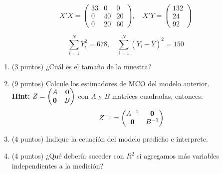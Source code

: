 \documentclass[10pt,a4paper]{article}
\begin{document}
\begin{enumerate}
    \[
    X'X = \begin{pmatrix}
    33 & 0 & 0 \\
    0 & 40 & 20 \\
    0 & 20 & 60
    \end{pmatrix}, \quad
    X'Y = \begin{pmatrix}
    132 \\
    24 \\
    92
    \end{pmatrix}
    \]
    
    \[
    \sum_{i=1}^{N} Y_i^2 = 678, \quad \sum_{i=1}^{N} (Y_i - \bar{Y})^2 = 150
    \]

    \begin{enumerate}
        \item (3 puntos) ¿Cuál es el tamaño de la muestra?\\
    
        \item (9 puntos) Calcule los estimadores de MCO del modelo anterior.\\
        \textbf{Hint:} \( Z = \begin{pmatrix} A &{\bf 0} \\ {\bf 0} & B \end{pmatrix} \) con \( A \) y \( B \) matrices cuadradas, entonces:\[Z^{-1} = \begin{pmatrix} A^{-1} & {\bf 0} \\{\bf 0} & B^{-1} \end{pmatrix}\]

        \item (4 puntos) Indique la ecuación del modelo predicho e interprete.

        \item (4 puntos) ¿Qué debería suceder con $R^2$ si agregamos más variables independientes a la medición?
        
    \end{enumerate}

\end{enumerate}
\end{document}
